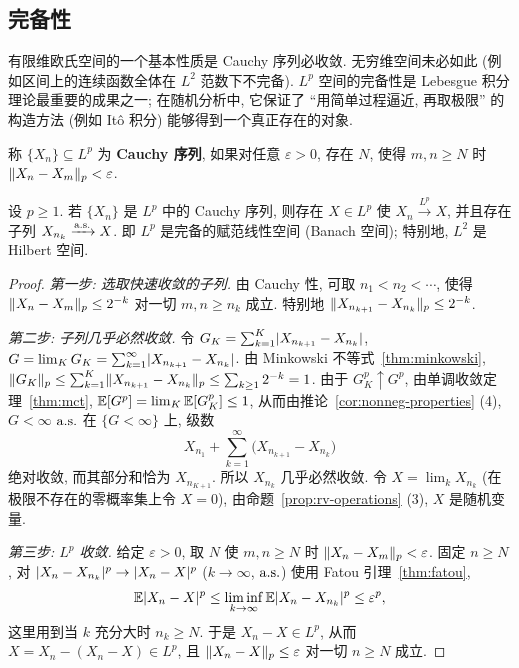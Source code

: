 \subsection{完备性}

有限维欧氏空间的一个基本性质是 Cauchy 序列必收敛. 无穷维空间未必如此 (例如区间上的连续函数全体在 $L^2$ 范数下不完备). $L^p$ 空间的完备性是 Lebesgue 积分理论最重要的成果之一; 在随机分析中, 它保证了 ``用简单过程逼近, 再取极限'' 的构造方法 (例如 Itô 积分) 能够得到一个真正存在的对象.

\begin{definition}[Cauchy 序列]
称 $\{X_n\}\subseteq L^p$ 为 \textbf{Cauchy 序列}, 如果对任意 $\varepsilon>0$, 存在 $N$, 使得 $m,n\ge N$ 时 $\lVert X_n-X_m\rVert_p<\varepsilon$.
\end{definition}

\begin{theorem}\label{thm:riesz-fischer}
设 $p\ge1$. 若 $\{X_n\}$ 是 $L^p$ 中的 Cauchy 序列, 则存在 $X\in L^p$ 使 $X_n\xrightarrow{L^p}X$, 并且存在子列 $X_{n_k}\xrightarrow{\text{a.s.}}X$. 即 $L^p$ 是完备的赋范线性空间 (Banach 空间); 特别地, $L^2$ 是 Hilbert 空间.
\end{theorem}

\begin{proof}
\emph{第一步: 选取快速收敛的子列.} 由 Cauchy 性, 可取 $n_1<n_2<\cdots$, 使得 $\lVert X_n-X_m\rVert_p\le2^{-k}$ 对一切 $m,n\ge n_k$ 成立. 特别地 $\lVert X_{n_{k+1}}-X_{n_k}\rVert_p\le2^{-k}$.

\emph{第二步: 子列几乎必然收敛.} 令 $G_K=\sum_{k=1}^K\lvert X_{n_{k+1}}-X_{n_k}\rvert$, $G=\lim_KG_K=\sum_{k=1}^\infty\lvert X_{n_{k+1}}-X_{n_k}\rvert$. 由 Minkowski 不等式~\ref{thm:minkowski},
$\lVert G_K\rVert_p\le\sum_{k=1}^K\lVert X_{n_{k+1}}-X_{n_k}\rVert_p\le\sum_{k\ge1}2^{-k}=1$. 由于 $G_K^p\uparrow G^p$, 由单调收敛定理~\ref{thm:mct}, $\mathbb{E}[G^p]=\lim_K\mathbb{E}[G_K^p]\le1$, 从而由推论~\ref{cor:nonneg-properties} (4), $G<\infty$ $\text{a.s.}$ 在 $\{G<\infty\}$ 上, 级数
\[
X_{n_1}+\sum_{k=1}^\infty\big(X_{n_{k+1}}-X_{n_k}\big)
\]
绝对收敛, 而其部分和恰为 $X_{n_{K+1}}$. 所以 $X_{n_k}$ 几乎必然收敛. 令 $X=\lim_kX_{n_k}$ (在极限不存在的零概率集上令 $X=0$), 由命题~\ref{prop:rv-operations} (3), $X$ 是随机变量.

\emph{第三步: $L^p$ 收敛.} 给定 $\varepsilon>0$, 取 $N$ 使 $m,n\ge N$ 时 $\lVert X_n-X_m\rVert_p<\varepsilon$. 固定 $n\ge N$, 对 $\lvert X_n-X_{n_k}\rvert^p\to\lvert X_n-X\rvert^p$ ($k\to\infty$, $\text{a.s.}$) 使用 Fatou 引理~\ref{thm:fatou},
\[
\mathbb{E}\lvert X_n-X\rvert^p\le\liminf_{k\to\infty}\mathbb{E}\lvert X_n-X_{n_k}\rvert^p\le\varepsilon^p,
\]
这里用到当 $k$ 充分大时 $n_k\ge N$. 于是 $X_n-X\in L^p$, 从而 $X=X_n-(X_n-X)\in L^p$, 且 $\lVert X_n-X\rVert_p\le\varepsilon$ 对一切 $n\ge N$ 成立.
\end{proof}

